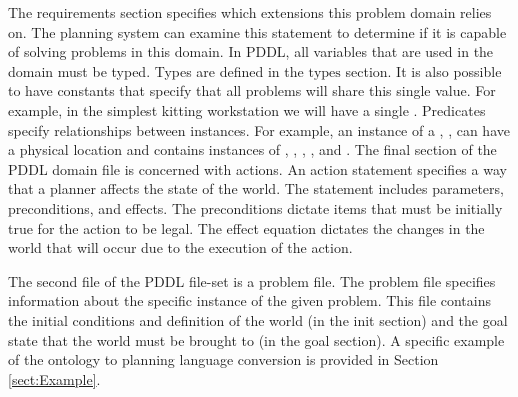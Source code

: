The requirements section specifies which extensions this problem domain relies on. The planning system can examine this statement to determine if it is capable of solving problems in this domain. In PDDL, all variables that are used in the domain must be typed. Types are defined in the $\mathrm{types}$ section. It is also possible to have constants that specify that all problems will share this single value. For example, in the simplest kitting workstation we will have a single  .
Predicates specify relationships between instances. For example, an instance of a , , can have a physical location and contains instances of , , , , and . The final section of the PDDL domain file is concerned with actions. An action statement specifies a way that a planner affects the state of the world. The statement includes parameters, preconditions, and effects. The preconditions dictate items that must be initially true for the action to be legal. The effect equation dictates the changes in the world that will occur due to the execution of the action.

The second file of the PDDL file-set is a  problem file. The problem file specifies information about the specific instance of the given problem. This file contains the initial conditions and definition of the world (in the init section) and the goal state that the world must be brought to (in the goal section). A specific example of the ontology to planning language conversion is provided in Section \ref{sect:Example}.


